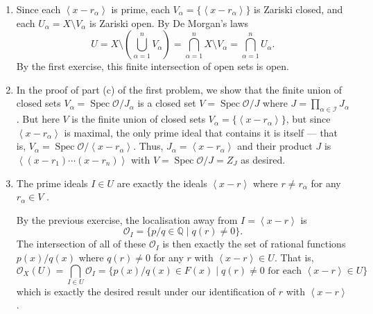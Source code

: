 \documentclass[12 pt, letterpaper]{hmcpset}
\begin{document}
\begin{solution}
	\begin{enumerate}
		\item Since each $\left < x - r_{\alpha} \right >$ is prime, each $V_{\alpha} = \{ \left < x - r_{\alpha} \right > \}$ is Zariski closed, and each $U_{\alpha} = X \setminus V_{\alpha}$ is Zariski open. By De Morgan's laws
			\[
				U = X \setminus \left ( \bigcup_{\alpha = 1}^{n} V_{\alpha} \right ) = \bigcap_{\alpha = 1}^{n} X \setminus V_{\alpha} = \bigcap_{\alpha = 1}^{n} U_{\alpha}.
			\]
			By the first exercise, this finite intersection of open sets is open.
		\item In the proof of part (c) of the first problem, we show that the finite union of closed sets $V_{\alpha} = \operatorname{Spec} \mathcal{O} / J_{\alpha}$ is a closed set $V = \operatorname{Spec} \mathcal{O} / J$ where $J = \prod_{\alpha \in \mathcal{I}} J_{\alpha}$. But here $V$ is the finite union of closed sets $V_{\alpha} = \{ \left < x - r_{\alpha} \right > \}$, but since $\left < x - r_{\alpha} \right >$ is maximal, the only prime ideal that contains it is itself --- that is, $V_{\alpha} = \operatorname{Spec} \mathcal{O} / \left < x - r_{\alpha} \right >$. Thus, $J_{\alpha} = \left < x - r_{\alpha} \right >$ and their product $J$ is $\left < (x - r_{1}) \dotsm (x - r_{n}) \right >$ with $V = \operatorname{Spec} \mathcal{O} / J = Z_{J}$ as desired.
		\item The prime ideals $I \in U$ are exactly the ideals $\left < x - r \right >$ where $r \neq r_{\alpha}$ for any $r_{\alpha} \in V$	. 

			By the previous exercise, the localisation away from $I = \left < x - r \right >$ is
			\[
				\mathcal{O}_{I} = \{ p / q \in \mathbb{Q} \mid q(r) \neq 0 \}.
			\]
			The intersection of all of these $\mathcal{O}_{I}$ is then exactly the set of rational functions $p(x) / q(x)$ where $q(r) \neq 0$ for any $r$ with $\left < x - r \right > \in U$. That is,
			\[
				\mathcal{O}_{X}(U) = \bigcap_{I \in U} \mathcal{O}_{I} = \{ p(x) / q(x) \in F(x) \mid q(r) \neq 0 \text{ for each } \left < x - r \right > \in U \}
			\]
			which is exactly the desired result under our identification of $r$ with $\left < x - r \right >$.
	\end{enumerate}
\end{solution}
\end{document}
